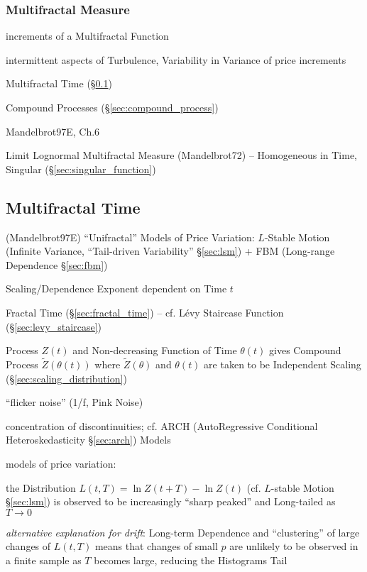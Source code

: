 \subsubsection{Multifractal Measure}\label{sec:multifractal_measure}

increments of a Multifractal Function

intermittent aspects of Turbulence, Variability in Variance of price increments

Multifractal Time (\S\ref{sec:multifractal_time})

Compound Processes (\S\ref{sec:compound_process})

Mandelbrot97E, Ch.6

Limit Lognormal Multifractal Measure (Mandelbrot72) -- Homogeneous in Time,
Singular (\S\ref{sec:singular_function})



\subsection{Multifractal Time}\label{sec:multifractal_time}

(Mandelbrot97E) ``Unifractal'' Models of Price Variation: $L$-Stable Motion
(Infinite Variance, ``Tail-driven Variability'' \S\ref{sec:lsm}) + FBM
(Long-range Dependence \S\ref{sec:fbm})

Scaling/Dependence Exponent dependent on Time $t$

Fractal Time (\S\ref{sec:fractal_time}) -- cf. L\'evy Staircase Function
(\S\ref{sec:levy_staircase})

Process $Z(t)$ and Non-decreasing Function of Time $\theta(t)$ gives Compound
Process $\tilde{Z}(\theta(t))$ where $\tilde{Z}(\theta)$ and $\theta(t)$ are
taken to be Independent Scaling (\S\ref{sec:scaling_distribution})

``flicker noise'' (1/f, Pink Noise)

concentration of discontinuities; cf. ARCH (AutoRegressive Conditional
Heteroskedasticity \S\ref{sec:arch}) Models

models of price variation:

the Distribution $L(t, T) = \ln Z(t + T) - \ln Z(t)$ (cf. $L$-stable Motion
\S\ref{sec:lsm}) is observed to be increasingly ``sharp peaked'' and Long-tailed
as $T \to 0$

\emph{alternative explanation for drift}: Long-term Dependence and
``clustering'' of large changes of $L(t, T)$ means that changes of small $p$ are
unlikely to be observed in a finite sample as $T$ becomes large, reducing the
Histograms Tail

